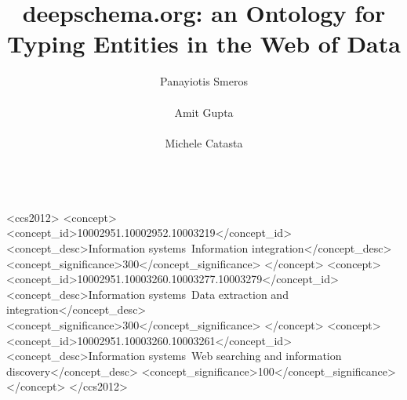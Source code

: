 \documentclass{sig-alternate}
\begin{document}
	
	
	
	\doi{}
	
	\isbn{}
	
	
	\acmPrice{}
	

\title{deepschema.org: an Ontology for Typing Entities in the Web of Data}

\author{
	\alignauthor
	Panayiotis Smeros\\
	\\
	\alignauthor
	Amit Gupta\\
	\\
	\alignauthor 
	Michele Catasta\\
	\\
}

\maketitle

\sloppy



\begin{CCSXML}
	<ccs2012>
	<concept>
	<concept_id>10002951.10002952.10003219</concept_id>
	<concept_desc>Information systems~Information integration</concept_desc>
	<concept_significance>300</concept_significance>
	</concept>
	<concept>
	<concept_id>10002951.10003260.10003277.10003279</concept_id>
	<concept_desc>Information systems~Data extraction and integration</concept_desc>
	<concept_significance>300</concept_significance>
	</concept>
	<concept>
	<concept_id>10002951.10003260.10003261</concept_id>
	<concept_desc>Information systems~Web searching and information discovery</concept_desc>
	<concept_significance>100</concept_significance>
	</concept>
	</ccs2012>
\end{CCSXML}
\end{document}
